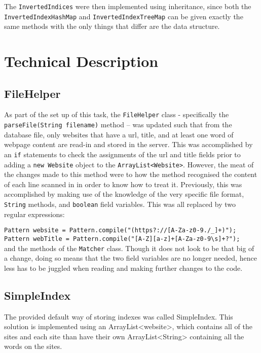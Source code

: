 The {\tt InvertedIndices} were then implemented using inheritance, since both the {\tt InvertedIndexHashMap} and {\tt InvertedIndexTreeMap} can be given exactly the same methods with the only things that differ are the data structure.

\section{Technical Description}
\subsection{FileHelper}
As part of the set up of this task, the {\tt FileHelper} class - specifically the \\ {\tt parseFile(String filename)} method – was updated such that from the database file, only websites that have a url, title, and at least one word of webpage content are read-in and stored in the server.
This was accomplished by an {\tt if} statements to check the assignments of the url and title fields prior to adding a {\tt new Website} object to the {\tt ArrayList<Website>}. However, the meat of the changes made to this method were to how the method recognised the content of each line scanned in in order to know how to treat it.
Previously, this was accomplished by making use of the knowledge of the very specific file format, {\tt String} methods, and {\tt boolean} field variables.
This was all replaced by two regular expressions:

{\tt Pattern website = Pattern.compile("(https?://[A-Za-z0-9./\_]+)");} \\
{\tt Pattern webTitle = Pattern.compile("[A-Z][a-z]+[A-Za-z0-9\textbackslash s]+?");} \\

and the methods of the {\tt Matcher} class. Though it does not look to be that big of a change, doing so means that the two field variables are no longer needed, hence less has to be juggled when reading and making further changes to the code.

\subsection{SimpleIndex}
The provided default way of storing indexes was called SimpleIndex. This solution is implemented using an ArrayList<website>, which contains all of the sites and each site than have their own ArrayList<String>  containing all the words on the sites. \\

